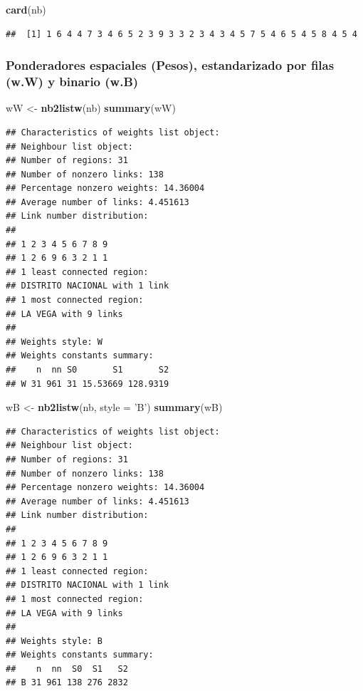 \documentclass[11pt,]{article}
\newenvironment{Shaded}{\begin{snugshade}}{\end{snugshade}}
\newcommand{\KeywordTok}[1]{\textcolor[rgb]{0.13,0.29,0.53}{\textbf{#1}}}
\newcommand{\DataTypeTok}[1]{\textcolor[rgb]{0.13,0.29,0.53}{#1}}
\newcommand{\StringTok}[1]{\textcolor[rgb]{0.31,0.60,0.02}{#1}}
\newcommand{\NormalTok}[1]{#1}
\begin{document}
\begin{Shaded}
\begin{Highlighting}[]
\KeywordTok{card}\NormalTok{(nb)}
\end{Highlighting}
\end{Shaded}

\begin{verbatim}
##  [1] 1 6 4 4 7 3 4 6 5 2 3 9 3 3 2 3 4 3 4 5 7 5 4 6 5 4 5 8 4 5 4
\end{verbatim}

\subsubsection{Ponderadores espaciales (Pesos), estandarizado por filas
(w.W) y binario
(w.B)}\label{ponderadores-espaciales-pesos-estandarizado-por-filas-w.w-y-binario-w.b}

\begin{Shaded}
\begin{Highlighting}[]
\NormalTok{wW <-}\StringTok{ }\KeywordTok{nb2listw}\NormalTok{(nb)}
\KeywordTok{summary}\NormalTok{(wW)}
\end{Highlighting}
\end{Shaded}

\begin{verbatim}
## Characteristics of weights list object:
## Neighbour list object:
## Number of regions: 31 
## Number of nonzero links: 138 
## Percentage nonzero weights: 14.36004 
## Average number of links: 4.451613 
## Link number distribution:
## 
## 1 2 3 4 5 6 7 8 9 
## 1 2 6 9 6 3 2 1 1 
## 1 least connected region:
## DISTRITO NACIONAL with 1 link
## 1 most connected region:
## LA VEGA with 9 links
## 
## Weights style: W 
## Weights constants summary:
##    n  nn S0       S1       S2
## W 31 961 31 15.53669 128.9319
\end{verbatim}

\begin{Shaded}
\begin{Highlighting}[]
\NormalTok{wB <-}\StringTok{ }\KeywordTok{nb2listw}\NormalTok{(nb, }\DataTypeTok{style =} \StringTok{'B'}\NormalTok{)}
\KeywordTok{summary}\NormalTok{(wB)}
\end{Highlighting}
\end{Shaded}

\begin{verbatim}
## Characteristics of weights list object:
## Neighbour list object:
## Number of regions: 31 
## Number of nonzero links: 138 
## Percentage nonzero weights: 14.36004 
## Average number of links: 4.451613 
## Link number distribution:
## 
## 1 2 3 4 5 6 7 8 9 
## 1 2 6 9 6 3 2 1 1 
## 1 least connected region:
## DISTRITO NACIONAL with 1 link
## 1 most connected region:
## LA VEGA with 9 links
## 
## Weights style: B 
## Weights constants summary:
##    n  nn  S0  S1   S2
## B 31 961 138 276 2832
\end{verbatim}
\end{document}
